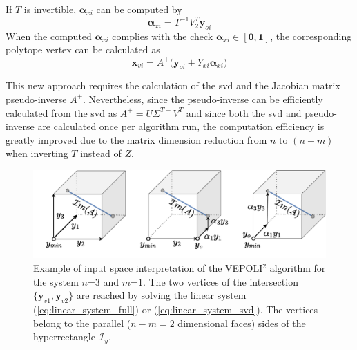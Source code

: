 If $T$ is invertible, $\bm{\alpha}_{xi}$ can be computed by
\begin{equation}
\bm{\alpha}_{xi} = T^{-1}V_2^T\bm{y}_{oi}
\label{eq:svd_linear_sys_step1}
\end{equation}
When the computed $\bm{\alpha}_{xi}$ complies with the check $\bm{\alpha}_{xi} \in [\bm{0},\bm{1}]$,  the corresponding polytope vertex can be calculated as
\begin{equation}
    \bm{x}_{vi} = A^{+} \big( \bm{y}_{oi} + Y_{xi}\bm{\alpha}_{xi}\big)
\label{eq:svd_linear_sys_step2}
\end{equation}

This new approach requires the calculation of the \gls{svd} and the Jacobian matrix pseudo-inverse $A^{+}$. Nevertheless, since the pseudo-inverse can be efficiently calculated from the \gls{svd} as $A^{+} = U\Sigma^{T+}V^T$ and since both the \gls{svd} and pseudo-inverse are calculated once per algorithm run, the computation efficiency is greatly improved due to the matrix dimension reduction from $n$ to $(n-m)$ when inverting $T$ instead of $Z$.

\begin{figure}[!t]
    \centering
    \includegraphics[width=0.9\linewidth]{Papers/images/intersection_example.pdf}
    \caption{Example of input space interpretation of the VEPOLI$^2$ algorithm for the system $n$=$3$ and $m$=$1$. The two vertices of the intersection $\{\bm{y}_{v1},\bm{y}_{v2}\}$ are reached by solving the linear system (\ref{eq:linear_system_full}) or (\ref{eq:linear_system_svd}). The vertices belong to the parallel ($n\!-\!m\!=\!2$ dimensional faces) sides of the hyperrectangle $\mathcal{I}_y$.  }
    \label{fig:intersection_example}
\end{figure}

